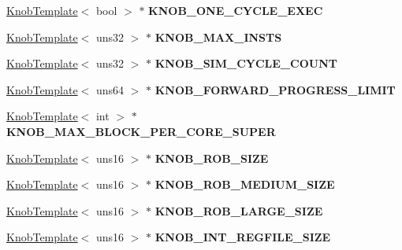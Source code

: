 \begin{DoxyCompactItemize}
\item 
\hypertarget{classall__knobs__c_a2c144aafeb5c53b7efe0b45285f282fb}{
\hyperlink{classKnobTemplate}{KnobTemplate}$<$ bool $>$ $\ast$ {\bfseries KNOB\_\-ONE\_\-CYCLE\_\-EXEC}}
\label{classall__knobs__c_a2c144aafeb5c53b7efe0b45285f282fb}

\item 
\hypertarget{classall__knobs__c_ab1e9660bb6b8b2c50159fead1177864d}{
\hyperlink{classKnobTemplate}{KnobTemplate}$<$ uns32 $>$ $\ast$ {\bfseries KNOB\_\-MAX\_\-INSTS}}
\label{classall__knobs__c_ab1e9660bb6b8b2c50159fead1177864d}

\item 
\hypertarget{classall__knobs__c_ae32ff1c2ebf42f91192e55bb9bec3bce}{
\hyperlink{classKnobTemplate}{KnobTemplate}$<$ uns32 $>$ $\ast$ {\bfseries KNOB\_\-SIM\_\-CYCLE\_\-COUNT}}
\label{classall__knobs__c_ae32ff1c2ebf42f91192e55bb9bec3bce}

\item 
\hypertarget{classall__knobs__c_ad1fcd292f0aa35e35d46e10962b56d2d}{
\hyperlink{classKnobTemplate}{KnobTemplate}$<$ uns64 $>$ $\ast$ {\bfseries KNOB\_\-FORWARD\_\-PROGRESS\_\-LIMIT}}
\label{classall__knobs__c_ad1fcd292f0aa35e35d46e10962b56d2d}

\item 
\hypertarget{classall__knobs__c_a4c19f37418e3b1f995b282b400f59130}{
\hyperlink{classKnobTemplate}{KnobTemplate}$<$ int $>$ $\ast$ {\bfseries KNOB\_\-MAX\_\-BLOCK\_\-PER\_\-CORE\_\-SUPER}}
\label{classall__knobs__c_a4c19f37418e3b1f995b282b400f59130}

\item 
\hypertarget{classall__knobs__c_a92311a2438bb16ccfdfd04f87a5a4ea2}{
\hyperlink{classKnobTemplate}{KnobTemplate}$<$ uns16 $>$ $\ast$ {\bfseries KNOB\_\-ROB\_\-SIZE}}
\label{classall__knobs__c_a92311a2438bb16ccfdfd04f87a5a4ea2}

\item 
\hypertarget{classall__knobs__c_a8866be3f0d7c4428cb51839a7752479e}{
\hyperlink{classKnobTemplate}{KnobTemplate}$<$ uns16 $>$ $\ast$ {\bfseries KNOB\_\-ROB\_\-MEDIUM\_\-SIZE}}
\label{classall__knobs__c_a8866be3f0d7c4428cb51839a7752479e}

\item 
\hypertarget{classall__knobs__c_af97b76d630902a1a4322336a33a17cc7}{
\hyperlink{classKnobTemplate}{KnobTemplate}$<$ uns16 $>$ $\ast$ {\bfseries KNOB\_\-ROB\_\-LARGE\_\-SIZE}}
\label{classall__knobs__c_af97b76d630902a1a4322336a33a17cc7}

\item 
\hypertarget{classall__knobs__c_ae9f995b8aa23028f796ca4ced808b5a3}{
\hyperlink{classKnobTemplate}{KnobTemplate}$<$ uns16 $>$ $\ast$ {\bfseries KNOB\_\-INT\_\-REGFILE\_\-SIZE}}
\label{classall__knobs__c_ae9f995b8aa23028f796ca4ced808b5a3}


\end{DoxyCompactItemize}
